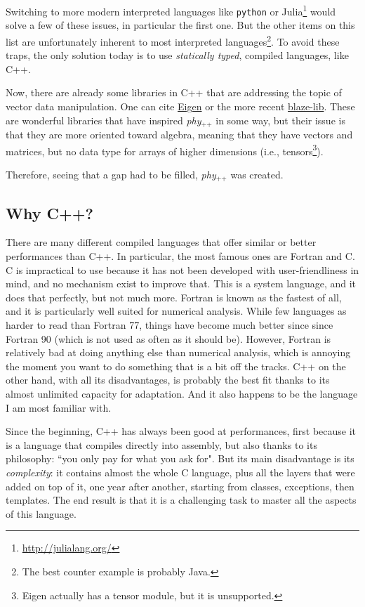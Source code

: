 \documentclass[12pt]{report}
\newcommand{\phypp}{\textit{phy}$_{\text{++}}$\xspace}
\begin{document}
Switching to more modern interpreted languages like \texttt{python} or Julia\footnote{\url{http://julialang.org/}} would solve a few of these issues, in particular the first one. But the other items on this list are unfortunately inherent to most interpreted languages\footnote{The best counter example is probably Java.}. To avoid these traps, the only solution today is to use \emph{statically typed}, compiled languages, like C++.

Now, there are already some libraries in C++ that are addressing the topic of vector data manipulation. One can cite \href{http://eigen.tuxfamily.org}{Eigen} or the more recent \href{https://code.google.com/p/blaze-lib/}{blaze-lib}. These are wonderful libraries that have inspired \phypp in some way, but their issue is that they are more oriented toward algebra, meaning that they have vectors and matrices, but no data type for arrays of higher dimensions (i.e., tensors\footnote{Eigen actually has a tensor module, but it is unsupported.}).

Therefore, seeing that a gap had to be filled, \phypp was created.

\subsection{Why C++?}

There are many different compiled languages that offer similar or better performances than C++. In particular, the most famous ones are Fortran and C. C is impractical to use because it has not been developed with user-friendliness in mind, and no mechanism exist to improve that. This is a system language, and it does that perfectly, but not much more. Fortran is known as the fastest of all, and it is particularly well suited for numerical analysis. While few languages as harder to read than Fortran 77, things have become much better since since Fortran 90 (which is not used as often as it should be). However, Fortran is relatively bad at doing anything else than numerical analysis, which is annoying the moment you want to do something that is a bit off the tracks. C++ on the other hand, with all its disadvantages, is probably the best fit thanks to its almost unlimited capacity for adaptation. And it also happens to be the language I am most familiar with.

Since the beginning, C++ has always been good at performances, first because it is a language that compiles directly into assembly, but also thanks to its philosophy: ``you only pay for what you ask for". But its main disadvantage is its \emph{complexity}: it contains almost the whole C language, plus all the layers that were added on top of it, one year after another, starting from classes, exceptions, then templates. The end result is that it is a challenging task to master all the aspects of this language.
\end{document}
